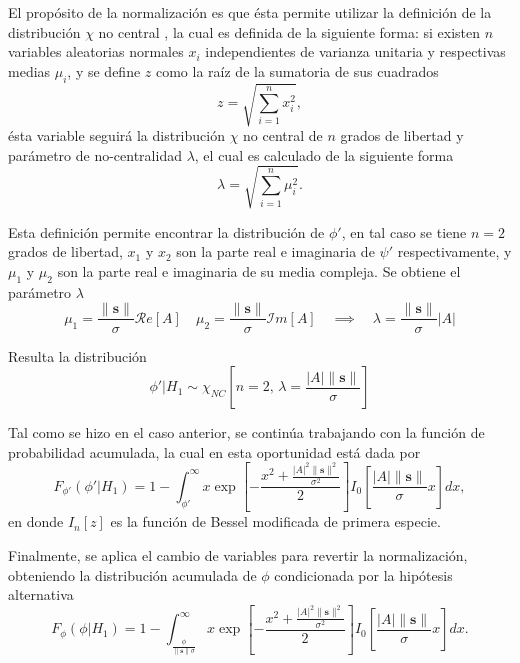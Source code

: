 El propósito de la normalización es que ésta permite utilizar la definición de la distribución $\chi$ no central \cite{distributions}, la cual es definida de la siguiente forma: si existen $n$ variables aleatorias normales $x_i$ independientes de varianza unitaria y respectivas medias $\mu_i$, y se define $z$ como la raíz de la sumatoria de sus cuadrados
\begin{equation}
    z = \sqrt{\sum_{i=1}^{n}x_i^2},
\end{equation}
ésta variable seguirá la distribución $\chi$ no central de $n$ grados de libertad y parámetro de no-centralidad $\lambda$, el cual es calculado de la siguiente forma
\begin{equation}
    \lambda = \sqrt{\sum_{i=1}^{n}\mu_i^2}.
\end{equation}

Esta definición permite encontrar la distribución de $\phi'$, en tal caso se tiene $n = 2$ grados de libertad, $x_1$ y $x_2$ son la parte real e imaginaria de $\psi'$ respectivamente, y $\mu_1$ y $\mu_2$ son la parte real e imaginaria de su media compleja. Se obtiene el parámetro $\lambda$
\begin{equation}
    \displaystyle\mu_1 = \frac{\rVert\mathbf{s}\rVert}{\sigma}\mathcal{R}e\left[A\right] \quad \displaystyle\mu_2 = \frac{\rVert\mathbf{s}\rVert}{\sigma}\mathcal{I}m\left[A\right] \quad \implies \quad \lambda = \frac{\lVert\mathbf{s}\rVert}{\sigma}\lvert A \rvert
\end{equation}

Resulta la distribución
\begin{equation}
    \phi' | H_1 \sim \chi_{NC}\left[n = 2, \, \lambda = \frac{|A|\lVert\mathbf{s}\rVert}{\sigma}\right] 
\end{equation}

Tal como se hizo en el caso anterior, se continúa trabajando con la función de probabilidad acumulada, la cual en esta oportunidad está dada por
\begin{equation}
    F_{\phi'}(\phi'|H_1) = 1-\int_{\phi'}^\infty x\exp\left[-\frac{x^2 + \frac{|A|^2\lVert\mathbf{s}\rVert^2}{\sigma^2}}{2}\right]I_0\left[\frac{|A|\lVert\mathbf{s}\rVert}{\sigma} x\right] dx,
\end{equation}
en donde $I_n[z]$ es la función de Bessel modificada de primera especie. 

Finalmente, se aplica el cambio de variables para revertir la normalización, obteniendo la distribución acumulada de $\phi$ condicionada por la hipótesis alternativa
\begin{equation}\label{eq:phi-ante-h1}
    F_\phi(\phi|H_1) = 1-\int_{\frac{\phi}{\lVert\mathbf{s}\rVert\sigma}}^\infty x\exp\left[-\frac{x^2 + \frac{|A|^2\lVert\mathbf{s}\rVert^2}{\sigma^2}}{2}\right]I_0\left[\frac{|A|\lVert\mathbf{s}\rVert}{\sigma} x\right] dx.
\end{equation}


